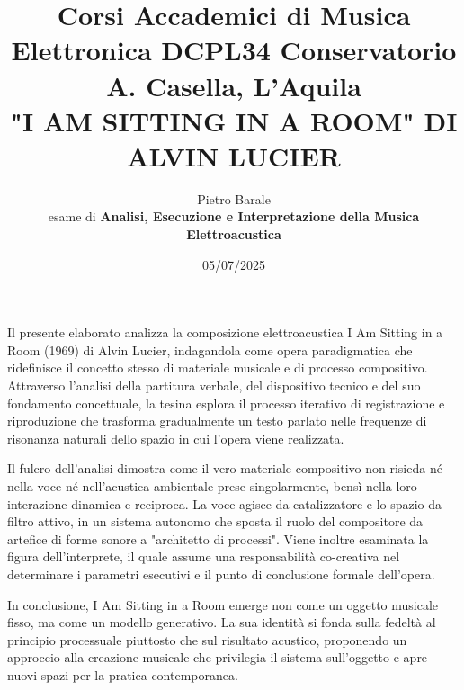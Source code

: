 \documentclass[a4paper,12pt]{article}
\title{Corsi Accademici di Musica Elettronica DCPL34 Conservatorio A. Casella, L'Aquila \\ \fontsize{14}{17}\bfseries\uppercase{"I am sitting in a room" di Alvin Lucier}}
\author{Pietro Barale \\ esame di \bfseries{Analisi, Esecuzione e Interpretazione della Musica Elettroacustica}}
\date{05/07/2025}
\begin{document}
\maketitle
\thispagestyle{empty}

\begin{center}
    \vspace{1cm}
    \textbf{\fontsize{12}{15}\selectfont{Sommario}}
\end{center}

Il presente elaborato analizza la composizione elettroacustica I Am Sitting in a Room (1969) di Alvin Lucier, indagandola come opera paradigmatica che ridefinisce il concetto stesso di materiale musicale e di processo compositivo. Attraverso l'analisi della partitura verbale, del dispositivo tecnico e del suo fondamento concettuale, la tesina esplora il processo iterativo di registrazione e riproduzione che trasforma gradualmente un testo parlato nelle frequenze di risonanza naturali dello spazio in cui l'opera viene realizzata.

Il fulcro dell'analisi dimostra come il vero materiale compositivo non risieda né nella voce né nell'acustica ambientale prese singolarmente, bensì nella loro interazione dinamica e reciproca. La voce agisce da catalizzatore e lo spazio da filtro attivo, in un sistema autonomo che sposta il ruolo del compositore da artefice di forme sonore a "architetto di processi". Viene inoltre esaminata la figura dell'interprete, il quale assume una responsabilità co-creativa nel determinare i parametri esecutivi e il punto di conclusione formale dell'opera.

In conclusione, I Am Sitting in a Room emerge non come un oggetto musicale fisso, ma come un modello generativo. La sua identità si fonda sulla fedeltà al principio processuale piuttosto che sul risultato acustico, proponendo un approccio alla creazione musicale che privilegia il sistema sull'oggetto e apre nuovi spazi per la pratica contemporanea.
\newpage
\tableofcontents  

\newpage



%
%
\end{document}
